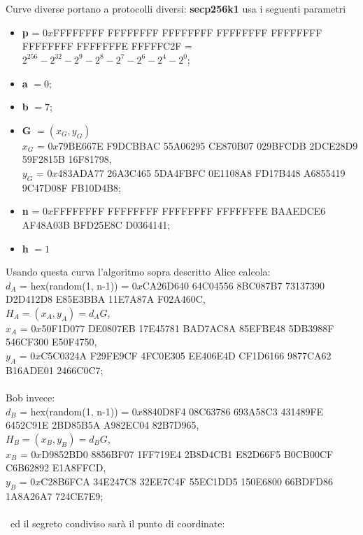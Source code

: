 \documentclass[a4paper,12pt]{tesiinfo}
\begin{document}
\\
\\
Curve diverse portano a protocolli diversi: \textbf{secp256k1} usa i seguenti parametri 
\begin{itemize}
 \item \textbf{p} = $0x$FFFFFFFF FFFFFFFF FFFFFFFF FFFFFFFF FFFFFFFF FFFFFFFF FFFFFFFE FFFFFC2F = $2^{256} - 2^{32}-2^9-2^8-2^7-2^6-2^4-2^0$;
 
 \item \textbf{a} $=0$;
 
 \item \textbf{b} $=7$;
 
 \item \textbf{G} $= (x_G, y_G)$
 \\
 $x_G$ = $0x$79BE667E F9DCBBAC 55A06295 CE870B07 029BFCDB 2DCE28D9 59F2815B 16F81798,
 \\
 $y_G$ = $0x$483ADA77 26A3C465 5DA4FBFC 0E1108A8 FD17B448 A6855419 9C47D08F FB10D4B8;
 
 \item \textbf{n} = $0x$FFFFFFFF FFFFFFFF FFFFFFFF FFFFFFFE BAAEDCE6 AF48A03B BFD25E8C D0364141;
 
 \item \textbf{h} $ = 1$
\end{itemize}
Usando questa curva l'algoritmo sopra descritto Alice calcola:\\
$d_A$ = hex(random(1, n-1)) = $0x$CA26D640 64C04556 8BC087B7 73137390 D2D412D8 E85E3BBA 11E7A87A F02A460C,\\
$H_A = (x_A, y_A) = d_AG$,\\
$x_A$ = $0x$50F1D077 DE0807EB 17E45781 BAD7AC8A 85EFBE48 5DB3988F 546CF300 E50F4750,\\
$y_A$ = $0x$C5C0324A F29FE9CF 4FC0E305 EE406E4D CF1D6166 9877CA62 B16ADE01 2466C0C7;\\
\\
Bob invece:\\
$d_B$ = hex(random(1, n-1)) = $0x$8840D8F4 08C63786 693A58C3 431489FE 6452C91E 2BD85B5A A982EC04 82B7D965,\\
$H_B = (x_B, y_B) = d_BG$,\\
$x_B$ = $0x$D9852BD0 8856BF07 1FF719E4 2B8D4CB1 E82D66F5 B0CB00CF C6B62892 E1A8FFCD,\\
$y_B$ = $0x$C28B6FCA 34E247C8 32EE7C4F 55EC1DD5 150E6800 66BDFD86 1A8A26A7 724CE7E9;\\
\\\
ed il segreto condiviso sar\`a il punto di coordinate:\\
\end{document}
